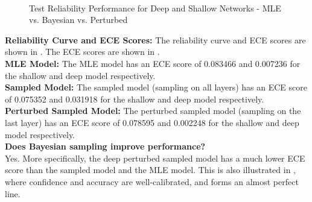 \begin{enumerate}
\begin{enumerate}
\begin{figure}[h!]
    \centering
     \\
    \caption{Test Reliability Performance for Deep and Shallow Networks - MLE vs. Bayesian vs. Perturbed}
    \label{fig:test_reliability_performance}
\end{figure}

    \textbf{Reliability Curve and ECE Scores:} The reliability curve and ECE
    scores are shown in . The ECE scores
    are shown in . \\

    \textbf{MLE Model:} The MLE model has an ECE score of 0.083466 and 0.007236 for the shallow and deep model respectively. \\
    \textbf{Sampled Model:} The sampled model (sampling on all layers) has an ECE score of 0.075352 and 0.031918 for the shallow and deep model respectively. \\
    \textbf{Perturbed Sampled Model:} The perturbed sampled model (sampling on the last layer) has an ECE score of 0.078595 and 0.002248 for the shallow and deep model respectively. \\
    
    \textbf{Does Bayesian sampling improve performance?} \\

    Yes. More specifically, the deep perturbed sampled model has a much lower
    ECE score than the sampled model and the MLE model. This is also illustrated
    in , where confidence and
    accuracy are well-calibrated, and forms an almost perfect line. \\


\end{enumerate}
\end{enumerate}
